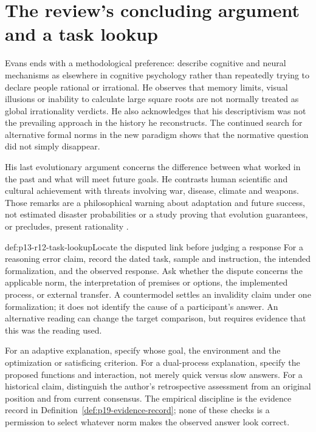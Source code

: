 \section{The review's concluding argument and a task lookup}

Evans ends with a methodological preference: describe cognitive and neural
mechanisms as elsewhere in cognitive psychology rather than repeatedly trying
to declare people rational or irrational.  He observes that memory limits,
visual illusions or inability to calculate large square roots are not normally
treated as global irrationality verdicts.  He also acknowledges that his
descriptivism was not the prevailing approach in the history he reconstructs.
The continued search for alternative formal norms in the new paradigm shows
that the normative question did not simply disappear.

His last evolutionary argument concerns the difference between what worked
in the past and what will meet future goals.  He contrasts human scientific
and cultural achievement with threats involving war, disease, climate and
weapons.  Those remarks are a philosophical warning about adaptation and
future success, not estimated disaster probabilities or a study proving that
evolution guarantees, or precludes, present rationality
\parencite[p.~96]{Evans2021RationalityDebate}.

\begin{hbmethod}{def:p13-r12-task-lookup}{Locate the disputed link before judging a response}
For a reasoning error claim, record the dated task, sample and instruction,
the intended formalization, and the observed response.  Ask whether the
dispute concerns the applicable norm, the interpretation of premises or
options, the implemented process, or external transfer.  A countermodel
settles an invalidity claim under one formalization; it does not identify
the cause of a participant's answer.  An alternative reading can change
the target comparison, but requires evidence that this was the reading used.

For an adaptive explanation, specify whose goal, the environment and the
optimization or satisficing criterion.  For a dual-process explanation,
specify the proposed functions and interaction, not merely quick versus
slow answers.  For a historical claim, distinguish the author's retrospective
assessment from an original position and from current consensus.  The
empirical discipline is the evidence record in
Definition~\ref{def:p19-evidence-record}; none of these checks is a permission
to select whatever norm makes the observed answer look correct.
\end{hbmethod}

